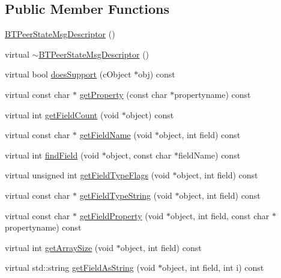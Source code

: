 \subsection*{Public Member Functions}
\begin{DoxyCompactItemize}
\item 
\hyperlink{classBTPeerStateMsgDescriptor_afbe153c943bdbaf08267d18ef1eb3ddd}{B\+T\+Peer\+State\+Msg\+Descriptor} ()
\item 
virtual \hyperlink{classBTPeerStateMsgDescriptor_a9619e3d770a31134405918c8f8399e84}{$\sim$\+B\+T\+Peer\+State\+Msg\+Descriptor} ()
\item 
virtual bool \hyperlink{classBTPeerStateMsgDescriptor_a89df95af44ba98c8131ca509060ff2e3}{does\+Support} (c\+Object $\ast$obj) const 
\item 
virtual const char $\ast$ \hyperlink{classBTPeerStateMsgDescriptor_a3ce19be83bc8b95050ecf078ac961c3f}{get\+Property} (const char $\ast$propertyname) const 
\item 
virtual int \hyperlink{classBTPeerStateMsgDescriptor_a40478abf31c5ba0c98cb715ce4af408e}{get\+Field\+Count} (void $\ast$object) const 
\item 
virtual const char $\ast$ \hyperlink{classBTPeerStateMsgDescriptor_a8f46fdfec6da532f2dd8c007b929db70}{get\+Field\+Name} (void $\ast$object, int field) const 
\item 
virtual int \hyperlink{classBTPeerStateMsgDescriptor_a3612922faba9e40dd0c73a1eb13fc7c8}{find\+Field} (void $\ast$object, const char $\ast$field\+Name) const 
\item 
virtual unsigned int \hyperlink{classBTPeerStateMsgDescriptor_ab453e5665f0979b623681234370a2603}{get\+Field\+Type\+Flags} (void $\ast$object, int field) const 
\item 
virtual const char $\ast$ \hyperlink{classBTPeerStateMsgDescriptor_a0f767afb60b1a49a6c1ed5af51870b00}{get\+Field\+Type\+String} (void $\ast$object, int field) const 
\item 
virtual const char $\ast$ \hyperlink{classBTPeerStateMsgDescriptor_adc631362e3fdf1f7b0ad447330f1df5f}{get\+Field\+Property} (void $\ast$object, int field, const char $\ast$propertyname) const 
\item 
virtual int \hyperlink{classBTPeerStateMsgDescriptor_aec03fd31374edc82d8429080065c2c65}{get\+Array\+Size} (void $\ast$object, int field) const 
\item 
virtual std\+::string \hyperlink{classBTPeerStateMsgDescriptor_a1ca01f72efbc6d6a3f1ac47e0a635128}{get\+Field\+As\+String} (void $\ast$object, int field, int i) const 

\end{DoxyCompactItemize}
